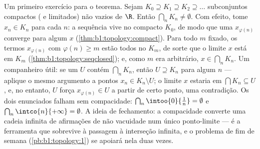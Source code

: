 \begin{example}\label{ex:b1:topology:nested}
Um primeiro exercício para o teorema. Sejam $K_0 \supseteq K_1 \supseteq
K_2 \supseteq \dots$ subconjuntos compactos ( e limitados) não vazios
de $\R$. Então $\bigcap_n K_n \neq \emptyset$. Com efeito, tome $x_n
\in K_n$ para cada $n$: a sequência vive no compacto $K_0$,
de modo que uma  $x_{\varphi(n)}$ converge para algum $x$
(\cref{thm:b1:topology:compact}). Para todo $m$ fixado, os termos
$x_{\varphi(n)}$ com $\varphi(n) \geq m$ estão todos no 
$K_m$, de sorte que o limite $x$ está em $K_m$
(\cref{thm:b1:topology:seqclosed}); e, como $m$ era arbitrário, $x \in
\bigcap_n K_n$. Um companheiro útil: se um  $U$ contém
$\bigcap_n K_n$, então $U \supseteq K_n$ para algum $n$ --- aplique
o mesmo argumento a pontos $x_n \in K_n \setminus U$; o limite
$x$ estaria em $\bigcap K_n \subseteq U$, e, no entanto, $U$  força
$x_{\varphi(n)} \in U$ a partir de certo ponto, uma contradição. Os dois
enunciados falham sem compacidade: $\bigcap_n \intoo{0}{\frac
1n} = \emptyset$ e $\bigcap_n \intco{n}{+\infty} = \emptyset$.
A ideia de fechamento: a compacidade converte uma cadeia infinita de
afirmações de não vacuidade num único ponto-limite --- é a
ferramenta que sobrevive à passagem à interseção infinita, e o
problema de fim de semana (\cref{pb:b1:topology:1}) se apoiará nela duas vezes.
\end{example}

